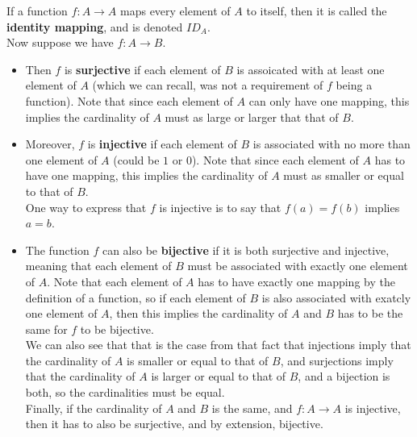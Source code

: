 \documentclass[12pt]{article}
\begin{document}
    If a function $f: A \to A$ maps every element of $A$ to itself,
    then it is called the \textbf{identity mapping},
    and is denoted $ID_A$. \\

    Now suppose we have $f: A \rightarrow B$.
    \begin{itemize}[label=$\diamond$]
        \item 
            Then $f$ is \textbf{surjective} if each element of $B$
            is assoicated with at least one element of $A$
            (which we can recall,
            was not a requirement of $f$ being a function).
            Note that since each element of $A$ can only have one mapping,
            this implies the cardinality of $A$
            must as large or larger that that of $B$.
        \item
            Moreover, $f$ is \textbf{injective}
            if each element of $B$ is associated with no more
            than one element of $A$ (could be $1$ or $0$).
            Note that since each element of $A$ has to have one mapping,
            this implies the cardinality of $A$
            must as smaller or equal to that of $B$. \\
            One way to express that $f$ is injective is to say that
            $f(a) = f(b)$ implies $a = b$.
        \item
            The function $f$ can also be \textbf{bijective}
            if it is both surjective and injective,
            meaning that each element of $B$ must be associated with
            exactly one element of $A$.
            Note that each element of $A$ has to have exactly one mapping
            by the definition of a function,
            so if each element of $B$ is also associated
            with exatcly one element of $A$,
            then this implies the cardinality 
            of $A$ and $B$ has to be the same for $f$ to be bijective. \\
            We can also see that that is the case from that fact 
            that injections imply that the cardinality of $A$
            is smaller or equal to that of $B$,
            and surjections imply that the cardinality of $A$
            is larger or equal to that of $B$,
            and a bijection is both, so the cardinalities must be equal. \\
            Finally, if the cardinality of $A$ and $B$ is the same,
            and  $f: A \rightarrow A$ is injective,
            then it has to also be surjective,
            and by extension, bijective.

\end{itemize}
\end{document}
